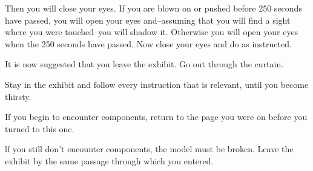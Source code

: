 Then you will close your eyes. If you are blown on or pushed before 
250 seconds have passed, you will open your eyes and--assuming that you 
will find a sight where you were touched--you will shadow it. Otherwise you 
will open your eyes when the 250 seconds have passed. Now close your eyes 
and do as instructed. 


It is now suggested that you leave the exhibit. Go out through the 
curtain. 

\clearpage
{}

Stay in the exhibit and follow every instruction that is relevant, until
you become thirsty. 


If you begin to encounter components, return to the page you were on 
before you turned to this one. 


lf you still don't encounter components, the model must be broken. 
Leave the exhibit by the same passage through which you entered. 

\clearpage

